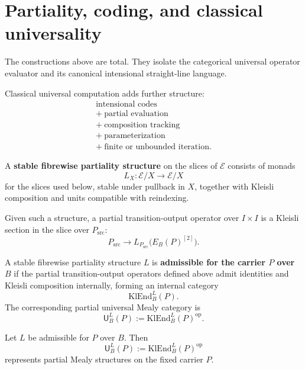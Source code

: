 \section{Partiality, coding, and classical universality}
\label{sec:partiality-coding-classical-universality}

The constructions above are total.  They isolate the categorical universal operator evaluator and
its canonical intensional straight-line language.

Classical universal computation adds further structure:
\[
\begin{array}{c}
\text{intensional codes} \\
{}+\ \text{partial evaluation} \\
{}+\ \text{composition tracking} \\
{}+\ \text{parameterization} \\
{}+\ \text{finite or unbounded iteration.}
\end{array}
\]

\begin{definition}
A \textbf{stable fibrewise partiality structure} on the slices of \(\mathcal E\) consists of
monads
\[
        L_X:\mathcal E/X\longrightarrow \mathcal E/X
\]
for the slices used below, stable under pullback in \(X\), together with Kleisli composition and
units compatible with reindexing.
\end{definition}

Given such a structure, a partial transition-output operator over \(I\times I\) is a Kleisli
section in the slice over \(P_{\mathrm{src}}\):
\[
        P_{\mathrm{src}}
        \longrightarrow
        L_{P_{\mathrm{src}}}\bigl(E_B(P)^{[2]}\bigr).
\]

\begin{definition}
A stable fibrewise partiality structure \(L\) is \textbf{admissible for the carrier \(P\) over
\(B\)} if the partial transition-output operators defined above admit identities and Kleisli
composition internally, forming an internal category
\[
        \mathrm{KlEnd}^L_B(P).
\]
The corresponding partial universal Mealy category is
\[
        \mathsf U^L_B(P)
        :=
        \mathrm{KlEnd}^L_B(P)^{\operatorname{op}}.
\]
\end{definition}

\begin{proposition}
\label{prop:partial-universal-mealy-category}
Let \(L\) be admissible for \(P\) over \(B\).  Then
\[
        \mathsf U^L_B(P):=\mathrm{KlEnd}^L_B(P)^{\operatorname{op}}
\]
represents partial Mealy structures on the fixed carrier \(P\).
\end{proposition}

